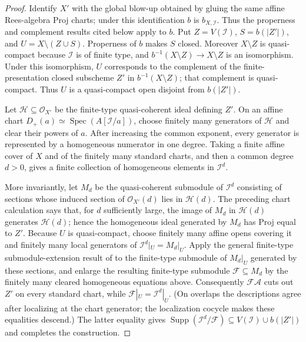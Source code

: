 \begin{proof}
  \leanok
  Identify $X'$ with the global blow-up obtained by gluing the same affine
  Rees-algebra Proj charts; under this identification $b$ is
  $b_{X,\mathcal I}$.  Thus the properness and complement results cited below
  apply to $b$.
  Put $Z=V(\mathcal I)$, $S=b(|Z'|)$, and
  $U=X\setminus(Z\cup S)$.  Properness of $b$ makes $S$ closed.  Moreover
  $X\setminus Z$ is quasi-compact because $\mathcal I$ is of finite type,
  and $b^{-1}(X\setminus Z)\to X\setminus Z$ is an isomorphism.  Under this
  isomorphism, $U$ corresponds to the complement of the finite-presentation
  closed subscheme $Z'$ in $b^{-1}(X\setminus Z)$; that complement is
  quasi-compact.  Thus $U$ is a quasi-compact open disjoint from $b(|Z'|)$.

  Let $\mathcal H\subseteq\mathcal O_{X'}$ be the finite-type
  quasi-coherent ideal defining $Z'$.  On an affine chart
  $D_+(a)\simeq\operatorname{Spec}(A[\mathcal I/a])$, choose finitely many
  generators of $\mathcal H$ and clear their powers of $a$.  After increasing
  the common exponent, every generator is represented by a homogeneous
  numerator in one degree.  Taking a finite affine cover of $X$ and of the
  finitely many standard charts, and then a common degree $d>0$, gives a
  finite collection of homogeneous elements in $\mathcal I^d$.

  More invariantly, let $M_d$ be the quasi-coherent submodule of
  $\mathcal I^d$ consisting of sections whose induced section of
  $\mathcal O_{X'}(d)$ lies in $\mathcal H(d)$.  The preceding chart
  calculation says that, for $d$ sufficiently large, the image of $M_d$ in
  $\mathcal H(d)$ generates $\mathcal H(d)$; hence the homogeneous ideal
  generated by $M_d$ has Proj equal to $Z'$.  Because $U$ is quasi-compact,
  choose finitely many affine opens covering it and finitely many local
  generators of $\mathcal I^d|_U=M_d|_U$.  Apply the general finite-type
  submodule-extension result of
   to the finite-type
  submodule of $M_d|_U$ generated by these sections, and enlarge the resulting
  finite-type submodule $\mathcal F\subseteq M_d$ by the finitely many cleared
  homogeneous equations above.  Consequently
  $\mathcal F\mathcal A$ cuts out $Z'$ on every standard chart, while
  $\mathcal F|_U=\mathcal I^d|_U$.  (On overlaps the descriptions agree after
  localizing at the chart generator; the localization cocycle makes these
  equalities descend.)  The latter equality gives
  $\operatorname{Supp}(\mathcal I^d/\mathcal F)\subseteq
  V(\mathcal I)\cup b(|Z'|)$ and completes the construction.
\end{proof}

